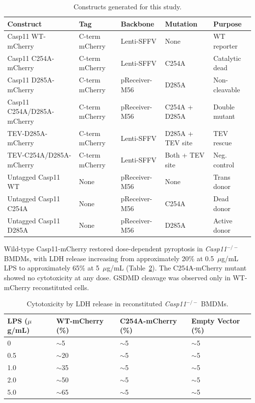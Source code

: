 \documentclass[11pt,a4paper]{article}
\begin{document}
\begin{table}[htbp]
\centering
\caption{Constructs generated for this study.}
\label{tab:constructs}
\small
\begin{tabular}{lllll}
\toprule
\textbf{Construct} & \textbf{Tag} & \textbf{Backbone} & \textbf{Mutation} & \textbf{Purpose} \\
\midrule
Casp11 WT-mCherry & C-term mCherry & Lenti-SFFV & None & WT reporter \\
Casp11 C254A-mCherry & C-term mCherry & Lenti-SFFV & C254A & Catalytic dead \\
Casp11 D285A-mCherry & C-term mCherry & pReceiver-M56 & D285A & Non-cleavable \\
Casp11 C254A/D285A-mCherry & C-term mCherry & pReceiver-M56 & C254A + D285A & Double mutant \\
TEV-D285A-mCherry & C-term mCherry & Lenti-SFFV & D285A + TEV site & TEV rescue \\
TEV-C254A/D285A-mCherry & C-term mCherry & Lenti-SFFV & Both + TEV site & Neg. control \\
Untagged Casp11 WT & None & pReceiver-M56 & None & Trans donor \\
Untagged Casp11 C254A & None & pReceiver-M56 & C254A & Dead donor \\
Untagged Casp11 D285A & None & pReceiver-M56 & D285A & Active donor \\
\bottomrule
\end{tabular}
\end{table}

Wild-type Casp11-mCherry restored dose-dependent pyroptosis in \textit{Casp11$^{-/-}$} BMDMs, with LDH release increasing from approximately 20\% at 0.5~$\mu$g/mL LPS to approximately 65\% at 5~$\mu$g/mL (Table~\ref{tab:ldh}). The C254A-mCherry mutant showed no cytotoxicity at any dose. GSDMD cleavage was observed only in WT-mCherry reconstituted cells.

\begin{table}[htbp]
\centering
\caption{Cytotoxicity by LDH release in reconstituted \textit{Casp11$^{-/-}$} BMDMs.}
\label{tab:ldh}
\begin{tabular}{llll}
\toprule
\textbf{LPS ($\mu$g/mL)} & \textbf{WT-mCherry (\%)} & \textbf{C254A-mCherry (\%)} & \textbf{Empty Vector (\%)} \\
\midrule
0 & $\sim$5 & $\sim$5 & $\sim$5 \\
0.5 & $\sim$20 & $\sim$5 & $\sim$5 \\
1.0 & $\sim$35 & $\sim$5 & $\sim$5 \\
2.0 & $\sim$50 & $\sim$5 & $\sim$5 \\
5.0 & $\sim$65 & $\sim$5 & $\sim$5 \\
\bottomrule
\end{tabular}
\end{table}
\end{document}
